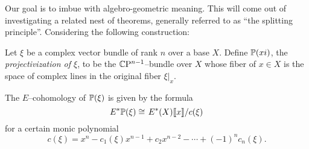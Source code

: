 Our goal is to imbue  with algebro-geometric meaning.  This will come out of investigating a related nest of theorems, generally referred to as ``the splitting principle''.  Considering the following construction:
\begin{definition}
Let $\xi$ be a complex vector bundle of rank $n$ over a base $X$.  Define $\P(xi)$, the \textit{projectivization of $\xi$}, to be the $\CP^{n-1}$--bundle over $X$ whose fiber of $x \in X$ is the space of complex lines in the original fiber $\xi|_x$.
\end{definition}

\begin{theorem}\label{CohomologyOfProjectivization}
The $E$--cohomology of $\P(\xi)$ is given by the formula \[E^* \P(\xi) \cong \left. E^*(X) \llbracket x \rrbracket \middle/ c(\xi) \right.\] for a certain monic polynomial \[c(\xi) = x^n - c_1(\xi) x^{n-1} + c_2 x^{n-2} - \cdots + (-1)^n c_n(\xi).\]
\end{theorem}
